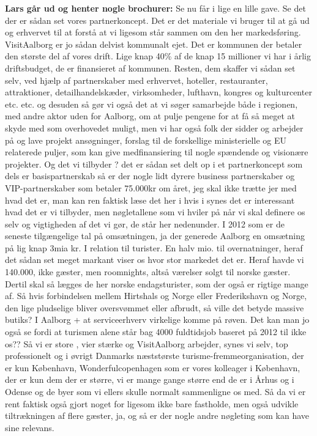 \textbf{Lars går ud og henter nogle brochurer:} Se nu får i lige en lille gave. Se det der er sådan set vores partnerkoncept. Det er det materiale vi bruger til at gå ud og erhvervet til at forstå at vi ligesom står sammen om den her markedsføring. VisitAalborg er jo sådan delvist kommunalt ejet. Det er kommunen der betaler den største del af vores drift. Lige knap 40\% af de knap 15 millioner vi har i årlig driftsbudget, de er finansieret af kommunen. Resten, dem skaffer vi sådan set selv, ved hjælp af partnerskaber med erhvervet, hoteller, restauranter, attraktioner, detailhandelskæder, virksomheder, lufthavn, kongres og kulturcenter etc. etc. og desuden så gør vi også det at vi søger samarbejde både i regionen, med andre aktor uden for Aalborg, om at pulje pengene for at få så meget at skyde med som overhovedet muligt, men vi har også folk der sidder og arbejder på og lave projekt ansøgninger, forslag til de forskellige ministerielle og EU relaterede puljer, som kan give medfinansiering til nogle spændende og visionære projekter. Og det vi tilbyder ? det er sådan set delt op i et partnerkoncept som dels er basispartnerskab så er der nogle lidt dyrere business partnerskaber og VIP-partnerskaber som betaler 75.000kr om året, jeg skal ikke trætte jer med hvad det er, man kan ren faktisk læse det her i hvis i synes det er interessant hvad det er vi tilbyder, men nøgletallene som vi hviler på når vi skal definere os selv og vigtigheden af det vi gør, de står her nedenunder. I 2012 som er de seneste tilgængelige tal på omsætningen, ja der generede Aalborg en omsætning på lig knap 3mia kr. I relation til turister. En halv mio. til overnatninger, heraf det sådan set meget markant viser os hvor stor markedet det er. Heraf havde vi 140.000, ikke gæster, men roomnights, altså værelser solgt til norske gæster. Dertil skal så lægges de her norske endagsturister, som der også er rigtige mange af. Så hvis forbindelsen mellem Hirtshals og Norge eller Frederikshavn og Norge, den lige pludselige bliver oversvømmet eller afbrudt, så ville det betyde massive butiks? I Aalborg + at serviceerhverv virkelige komme på røven. Det kan man jo også se fordi at turismen alene står bag 4000 fuldtidsjob baseret på 2012 til ikke os?? Så vi er store , vier stærke og VisitAalborg arbejder, synes vi selv, top professionelt og i øvrigt Danmarks næststørste turisme-fremmeorganisation, der er kun København, Wonderfulcopenhagen som er vores kolleager i København, der er kun dem der er større, vi er mange gange større end de er i Århus og i Odense og de byer som vi ellers skulle normalt sammenligne os med. Så da vi er rent faktisk også gjort noget for ligesom ikke bare fastholde, men også udvikle tiltrækningen af flere gæster, ja, og så er der nogle andre nøgleting som kan have sine relevans. \newline
